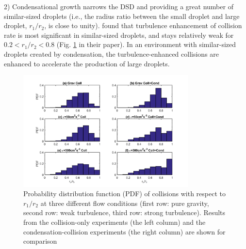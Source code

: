 2)	Condensational growth narrows the DSD and providing a great number of similar-sized droplets (i.e., the radius ratio between the small droplet and large droplet, $r_1/r_2$, is close to unity). \citet{Chen2018} found that turbulence enhancement of collision rate is most significant in similar-sized droplets, and stays relatively weak for $0.2<r_1/r_2<0.8$ (Fig. \ref{fig03} in their paper).  In an environment with similar-sized droplets created by condensation, the turbulence-enhanced collisions are enhanced to accelerate the production of large droplets. 

\begin{figure}[ht]
\centering
\includegraphics[width=0.8\textwidth]{Figures/Chap4/PDF_COLL.png}
\caption{Probability distribution function (PDF) of collisions with respect to $r_1/r_2$ at three different flow conditions (first row: pure gravity, second row: weak turbulence, third row: strong turbulence). Results from the collision-only experiments (the left column) and the condensation-collision experiments (the right column) are shown for comparison}\label{fig03}
\end{figure}

